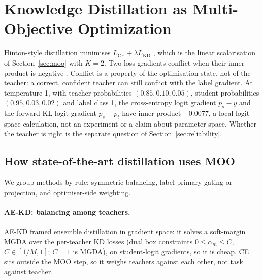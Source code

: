 \section{Knowledge Distillation as Multi-Objective Optimization}
\label{sec:kd_moo}

Hinton-style distillation minimises $L_{\mathrm{CE}}+\lambda L_{\mathrm{KD}}$
\citep{hinton2015kd}, which is the linear scalarisation of Section~\ref{sec:moo} with $K=2$.
Two loss gradients conflict when their inner product is negative \citep{yu2020pcgrad,zhu2021sckd}.
Conflict is a property of the optimisation state, not of the teacher: a correct, confident teacher can still conflict with the label gradient. At temperature 1,
with teacher probabilities $(0.85,0.10,0.05)$, student probabilities $(0.95,0.03,0.02)$ and
label class 1, the cross-entropy logit gradient $p_s-y$ and the forward-KL logit gradient
$p_s-p_t$ have inner product $-0.0077$, a local logit-space calculation, not an experiment or a
claim about parameter space. Whether the teacher is right is the separate question of Section~\ref{sec:reliability}.

\subsection{How state-of-the-art distillation uses MOO}
\label{sec:kd_moo_methods}

We group methods by rule: symmetric balancing, label-primary gating or projection, and optimiser-side weighting.

\paragraph{AE-KD: balancing among teachers.}
AE-KD \citep{du2020aekd} framed ensemble distillation in gradient space: it solves a soft-margin
MGDA over the per-teacher KD losses (dual box constraints $0\le\alpha_m\le C$, $C\in[1/M,1]$; $C=1$
is MGDA), on student-logit gradients, so it is cheap. CE sits outside the MOO step, so it
weighs teachers against each other, not task against teacher.

